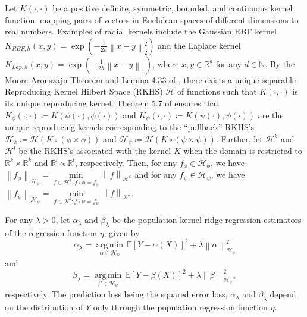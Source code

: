 \documentclass[11pt]{article}
\newcommand{\R}{\mathbb{R}}
\newcommand{\E}{\mathbb{E}}
\newcommand{\N}{\mathbb{N}}
\newcommand{\Hil}{\mathcal{H}}
\newcommand{\repone}{\phi}
\newcommand{\reptwo}{\psi}
\newcommand{\Hone}{\mathcal{H}_{\phi}}
\newcommand{\Htwo}{\mathcal{H}_{\psi}}
\newcommand{\norm}[1]{\left\|#1\right\|}
\DeclareMathOperator*{\argmin}{arg\,min}
\theoremstyle{plain}
\begin{document}
Let $K(\cdot,\cdot)$ be a positive definite, symmetric, bounded, and continuous kernel function, mapping pairs of vectors in Euclidean spaces of different dimensions to real numbers. Examples of radial kernels include the Gaussian RBF kernel $K_{RBF,h}(x,y) = \exp(-\frac{1}{2h}\norm{x-y}_{2}^{2})$ and the Laplace kernel $K_{Lap,h}(x,y) = \exp(-\frac{1}{2h}\norm{x-y}_{1})$, where $x,y\in \R^{d}$ for any $d\in \N$. By the Moore-Aronszajn Theorem \citep{aronszajn1950theory} and Lemma 4.33 of \citet{steinwart2008support}, there exists a unique separable Reproducing Kernel Hilbert Space (RKHS) $\Hil$ of functions such that $K(\cdot,\cdot)$ is its unique reproducing kernel. Theorem 5.7 of \citet{paulsen2016introduction}
ensures that $K_{\repone}(\cdot,\cdot) \coloneq K(\repone(\cdot),\repone(\cdot))$ and $K_{\reptwo}(\cdot,\cdot) \coloneq K(\reptwo(\cdot),\reptwo(\cdot))$ are the unique reproducing kernels corresponding to the ``pullback'' RKHS's $\Hone \coloneq \Hil\left(K \circ \left(\repone \times \repone\right)\right)$ and $\Htwo \coloneq \Hil\left(K \circ \left(\reptwo \times \reptwo\right)\right)$. Further, let $\Hil^{k}$ and $\Hil^{l}$ be the RKHS's associated with the kernel $K$ when the domain is restricted to $\R^{k} \times \R^{k}$ and $\R^{l} \times \R^{l}$, respectively. Then, for any $f_{\repone} \in \Hone$, we have $\norm{f_{\repone}}_{\Hone}=\underset{f \in \Hil^{k}: f \circ \repone = f_{\repone}}{\min}\norm{f}_{\Hil^{k}}$ and for any $f_{\reptwo} \in \Htwo$, we have $\norm{f_{\reptwo}}_{\Htwo}=\underset{f \in \Hil^{l}: f \circ \reptwo = f_{\reptwo}}{\min}\norm{f}_{\Hil^{l}}$. 

For any $\lambda>0$, let $\alpha_{\lambda}$ and $\beta_{\lambda}$ be the population kernel ridge regression estimators of the regression function $\eta$, given by
\begin{equation}\label{Defintion of alpha}
    \alpha_{\lambda} = \underset{\alpha \in \Hone}{\argmin} \hspace{2pt} \E\left[Y-\alpha(X)\right]^{2} + \lambda \norm{\alpha}_{\Hone}^{2}
\end{equation}
and
\begin{equation}\label{Defintion of beta}
\beta_{\lambda} = \underset{\beta \in \Htwo}{\argmin} \hspace{2pt} \E\left[Y-\beta(X)\right]^{2} + \lambda \norm{\beta}_{\Htwo}^{2},
\end{equation}
respectively. The prediction loss being the squared error loss, $\alpha_{\lambda}$ and $\beta_{\lambda}$ depend on the distribution of $Y$ only through the population regression function $\eta$.
\end{document}
